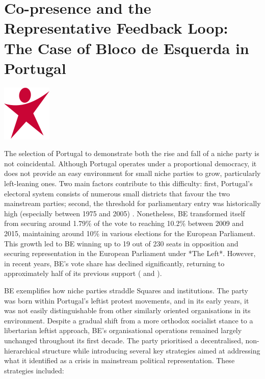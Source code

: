 \section{Co-presence and the Representative Feedback Loop: The Case of Bloco de Esquerda in Portugal}\label{sec:Co-presence and the Representative Feedback Loop: The Case of Left Bloc} %
\begin{marginfigure}
	\includegraphics{LeftBloc.svg.png}
\end{marginfigure}

The selection of Portugal to demonstrate both the rise and fall of a niche party is not coincidental. Although Portugal operates under a proportional democracy, it does not provide an easy environment for small niche parties to grow, particularly left-leaning ones. Two main factors contribute to this difficulty: first, Portugal's electoral system consists of numerous small districts that favour the two mainstream parties; second, the threshold for parliamentary entry was historically high (especially between 1975 and 2005) \parencite[see 129]{lisi2009}. Nonetheless, BE transformed itself from securing around 1.79\% of the vote to reaching 10.2\% between 2009 and 2015, maintaining around 10\% in various elections for the European Parliament. This growth led to BE winning up to 19 out of 230 seats in opposition and securing representation in the European Parliament under *The Left*. However, in recent years, BE’s vote share has declined significantly, returning to approximately half of its previous support (\cite[see 131]{lisi2009} and \cite{wikipedia2025}).

BE exemplifies how niche parties straddle Squares and institutions. The party was born within Portugal’s leftist protest movements, and in its early years, it was not easily distinguishable from other similarly oriented organisations in its environment. Despite a gradual shift from a more orthodox socialist stance to a libertarian leftist approach, BE’s organisational operations remained largely unchanged throughout its first decade. The party prioritised a decentralised, non-hierarchical structure while introducing several key strategies aimed at addressing what it identified as a crisis in mainstream political representation. These strategies included:

